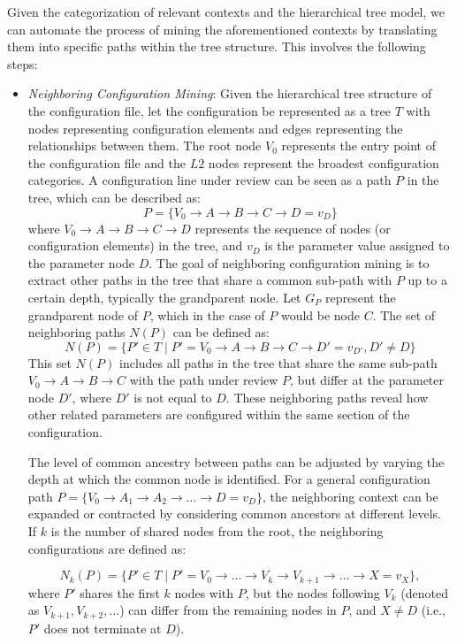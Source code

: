 Given the categorization of relevant contexts and the hierarchical tree model, we can automate the process of mining the aforementioned contexts by translating them into specific paths within the tree structure. This involves the following steps:
\begin{itemize}
    \item \textit{Neighboring Configuration Mining}: 
    Given the hierarchical tree structure of the configuration file, let the configuration be represented as a tree \( T \) with nodes representing configuration elements and edges representing the relationships between them. The root node \(V_0\) represents the entry point of the configuration file and the \(L2\) nodes represent the broadest configuration categories. A configuration line under review can be seen as a path \( P \) in the tree, which can be described as:
\[
P = \{V_0 \rightarrow A \rightarrow B \rightarrow C \rightarrow D = v_D \}
\]
where \( V_0  \rightarrow A \rightarrow B \rightarrow C \rightarrow D \) represents the sequence of nodes (or configuration elements) in the tree, and \( v_D \) is the parameter value assigned to the parameter node \( D \).
The goal of neighboring configuration mining is to extract other paths in the tree that share a common sub-path with \( P \) up to a certain depth, typically the grandparent node. Let \( G_P \) represent the grandparent node of \( P \), which in the case of \( P \) would be node \( C \). The set of neighboring paths \( N(P) \) can be defined as:
\[
N(P) = \{ P' \in T \mid P' = V_0 \rightarrow A \rightarrow B \rightarrow C \rightarrow D' = v_{D'}, D' \neq D \}
\]
This set \( N(P) \) includes all paths in the tree that share the same sub-path \( V_0 \rightarrow A \rightarrow B \rightarrow C \) with the path under review \( P \), but differ at the parameter node \( D' \), where \( D' \) is not equal to \( D \). These neighboring paths reveal how other related parameters are configured within the same section of the configuration.

The level of common ancestry between paths can be adjusted by varying the depth at which the common node is identified. 
For a general configuration path \( P = \{ V_0 \rightarrow A_1 \rightarrow A_2 \rightarrow \dots \rightarrow D = v_D \} \), the neighboring context can be expanded or contracted by considering common ancestors at different levels. If \( k \) is the number of shared nodes from the root, the neighboring configurations are defined as:

\[
N_k(P) = \{ P' \in T \mid P' = V_0 \rightarrow \dots \rightarrow V_k \rightarrow V_{k+1} \rightarrow \dots \rightarrow X = v_X \},
\]
where \( P' \) shares the first \( k \) nodes with \( P \), but the nodes following \( V_k \) (denoted as \( V_{k+1}, V_{k+2}, \dots \)) can differ from the remaining nodes in \( P \), and \( X \neq D \) (i.e., \( P' \) does not terminate at \( D \)).





\end{itemize}
